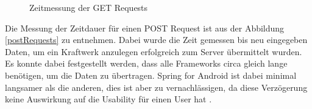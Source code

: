 \begin{figure} [ht]
	\centering
	 \qquad
	 \qquad
	 \qquad
	\caption{Zeitmessung der GET Requests} 
	\label{getRequests}
\end{figure} 
\newpage
Die Messung der Zeitdauer für einen POST Request ist aus der Abbildung \ref{postRequests} zu entnehmen. Dabei wurde die Zeit gemessen bis neu eingegeben Daten, um ein Kraftwerk anzulegen erfolgreich zum Server übermittelt wurden. Es konnte dabei festgestellt werden, dass alle Frameworks circa gleich lange benötigen, um die Daten zu übertragen. Spring for Android ist dabei minimal langsamer als die anderen, dies ist aber zu vernachlässigen, da diese Verzögerung keine Auswirkung auf die Usability für einen User hat \cite{meyer:performance}.

